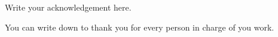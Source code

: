 Write your acknowledgement here. 
\vspace{10px}

You can write down to thank you for every person in charge of you work.
